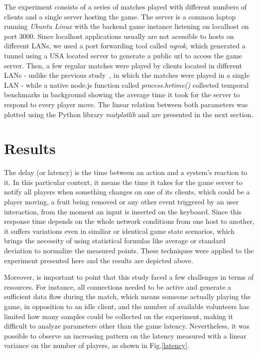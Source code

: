 \documentclass[english]{sbrt}
\begin{document}
The experiment consists of a series of matches played with different numbers of clients and a single server hosting the game.
The server is a common laptop running \textit{Ubuntu Linux} with the backend game instance listening on localhost on port 3000. Since localhost applications usually are not acessible to hosts on different LANs, we used a port forwarding tool called \textit{ngrok}, which generated a tunnel using a USA located server to generate a public url to access the game server. Then, a few regular matches were played by clients located in different LANs - unlike the previous study~\cite{previous}, in which the matches were played in a single LAN - while a native node.js function called \textit{process.hrtime()} collected temporal benchmarks in background showing the average time it took for the server to respond to every player move. The linear relation between both parameters was plotted using the Python library \textit{matplotlib} and are presented in the next section.

\section{\textbf{Results}}

The delay (or latency) is the time between an action and a system's reaction to it. In this particular context, it means the time it takes for the game server to notify all players when something changes on one of its clients, which could be a player moving, a fruit being removed or any other event triggered by an user interaction, from the moment an input is inserted on the keyboard. Since this response time depends on the whole network conditions from one host to another, it suffers variations even in similiar or identical game state scenarios, which brings the necessity of using statistical formulas like average or standard deviation to normalize the measured points. These techniques were applied to the experiment presented here and the results are depicted above.

Moreover, is important to point that this study faced a few challenges in terms of resources. For instance, all connections needed to be active and generate a sufficient data flow during the match, which means someone actually playing the game, in opposition to an idle client, and the number of available volunteers has limited how many samples could be collected on the experiment, making it difficult to analyze parameters other than the game latency. Nevertheless, it was possible to observe an increasing pattern on the latency measured with a linear variance on the number of players, as shown in Fig.\ref{latency}.
\end{document}
